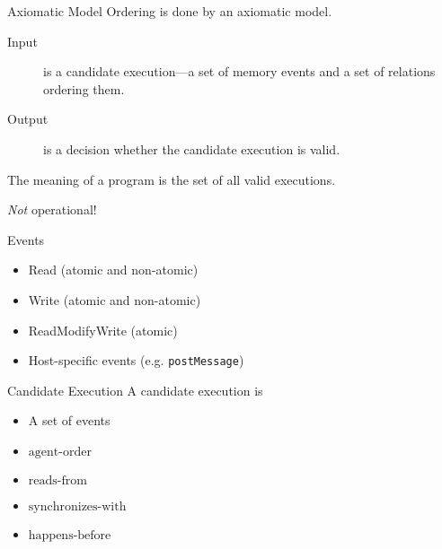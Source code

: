\documentclass{beamer}
\begin{document}
\begin{frame}{Axiomatic Model}
  Ordering is done by an axiomatic model.

  \begin{description}
  \item[Input] is a candidate execution---a set of memory events and a set of relations ordering them.
  \item[Output] is a decision whether the candidate execution is valid.
  \end{description}

  The meaning of a program is the set of all valid executions.

  \pause

  \begin{center}
    \emph{Not} operational!
  \end{center}

\end{frame}

\begin{frame}{Events}
  \begin{itemize}
  \item Read (atomic and non-atomic)
  \item Write (atomic and non-atomic)
  \item ReadModifyWrite (atomic)
  \item Host-specific events (e.g. \texttt{postMessage})
  \end{itemize}

\end{frame}

\begin{frame}{Candidate Execution}
  A candidate execution is

  \begin{itemize}
  \item A set of events
  \item $\textrm{agent-order}$
  \item $\textrm{reads-from}$
  \item $\textrm{synchronizes-with}$
  \item $\textrm{happens-before}$
  \end{itemize}
\end{frame}
\end{document}
